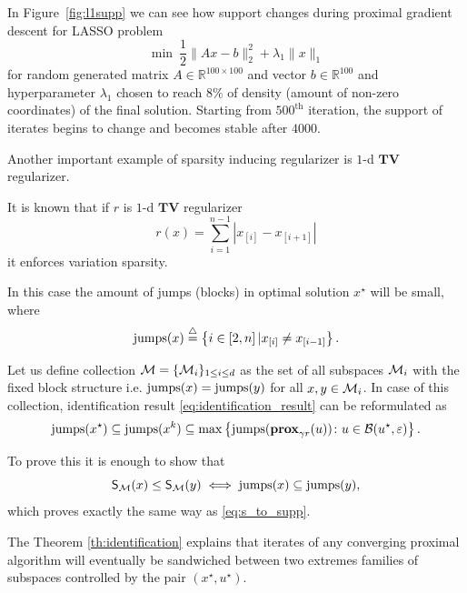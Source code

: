 In Figure~\ref{fig:l1supp} we can see how support changes during proximal gradient descent for LASSO problem 
$$
\min~\frac12\|Ax-b\|_2^2 + \lambda_1\|x\|_1
$$
for random generated matrix $A\in\mathbb{R}^{100\times100}$ and vector $b\in\mathbb{R}^{100}$ and hyperparameter $\lambda_1$ chosen to reach $8\%$ of density (amount of non-zero coordinates) of the final solution.
Starting from $500^{\text{th}}$ iteration, the support of iterates begins to change and becomes stable after $4000$. 


Another important example of sparsity inducing regularizer is $1$-d $\mathbf{TV}$ regularizer.
\begin{example}\label{ex:intro_jump_strata}
It is known that if $r$ is $1$-d $\mathbf{TV}$ regularizer
\begin{equation}\label{eq:tvreg}
    r(x) = \sum\limits_{i=1}^{n-1}|x_{[i]} - x_{[i+1]}|
\end{equation}
it enforces variation sparsity.    

In this case the amount of jumps (blocks) in optimal solution $x^\star$ will be small, where
\begin{equation}
\mathrm{jumps}(x)\stackrel{\triangle}{=} \left\{i\in [2,n]\,| x_{[i]} \neq x_{[i-1]} \right\}.    
\end{equation}

Let us define collection $\mathcal{M} = \{\mathcal{M}_i\}_{1\leq i\leq d}$ as the set of all subspaces $\mathcal{M}_i$ with the fixed block structure i.e. $\mathrm{jumps}(x) = \mathrm{jumps}(y)$ for all $x,y\in \mathcal{M}_i$. In case of this collection, identification result \eqref{eq:identification_result} can be reformulated as
\begin{equation}\label{eq:ident_tv}
    \mathrm{jumps}(x^\star) \subseteq \mathrm{jumps}(x^k) \subseteq \max\left\{\mathrm{jumps}(\mathbf{prox}_{\gamma r}(u))\colon{u\in\mathcal{B}(u^\star,\varepsilon)} \right\}.
\end{equation}

To prove this it is enough to show that
\begin{equation}\label{eq:s_to_jumps}
    \mathsf{S}_{\mathcal{M}}(x)\leq\mathsf{S}_{\mathcal{M}}(y) \iff \mathrm{jumps}(x)\subseteq\mathrm{jumps}(y),
\end{equation}
which proves exactly the same way as \eqref{eq:s_to_supp}.

\end{example}


The Theorem \ref{th:identification} explains that iterates of any converging proximal algorithm will eventually be sandwiched between two extremes families of subspaces controlled by the pair $(x^\star, u^\star)$.


